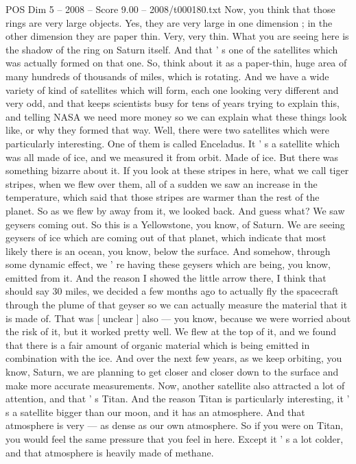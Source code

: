 \begin{textsample}{POS Dim 5 – 2008 – Score 9.00 – 2008/t000180.txt}
Now, you think that those rings are very large objects.
Yes, they are very large in one dimension ; in the other dimension they are paper thin.
Very, very thin.
What you are seeing here is the shadow of the ring on Saturn itself.
And that ' s one of the satellites which was actually formed on that one.
So, think about it as a paper-thin, huge area of many hundreds of thousands of miles, which is rotating.
And we have a wide variety of kind of satellites which will form, each one looking very different and very odd, and that keeps scientists busy for tens of years trying to explain this, and telling NASA we need more money so we can explain what these things look like, or why they formed that way.
Well, there were two satellites which were particularly interesting.
One of them is called Enceladus.
It ' s a satellite which was all made of ice, and we measured it from orbit.
Made of ice.
But there was something bizarre about it.
If you look at these stripes in here, what we call tiger stripes, when we flew over them, all of a sudden we saw an increase in the temperature, which said that those stripes are warmer than the rest of the planet.
So as we flew by away from it, we looked back.
And guess what?
We saw geysers coming out.
So this is a Yellowstone, you know, of Saturn.
We are seeing geysers of ice which are coming out of that planet, which indicate that most likely there is an ocean, you know, below the surface.
And somehow, through some dynamic effect, we ' re having these geysers which are being, you know, emitted from it.
And the reason I showed the little arrow there, I think that should say 30 miles, we decided a few months ago to actually fly the spacecraft through the plume of that geyser so we can actually measure the material that it is made of.
That was [ unclear ] also — you know, because we were worried about the risk of it, but it worked pretty well.
We flew at the top of it, and we found that there is a fair amount of organic material which is being emitted in combination with the ice.
And over the next few years, as we keep orbiting, you know, Saturn, we are planning to get closer and closer down to the surface and make more accurate measurements.
Now, another satellite also attracted a lot of attention, and that ' s Titan.
And the reason Titan is particularly interesting, it ' s a satellite bigger than our moon, and it has an atmosphere.
And that atmosphere is very — as dense as our own atmosphere.
So if you were on Titan, you would feel the same pressure that you feel in here.
Except it ' s a lot colder, and that atmosphere is heavily made of methane.

\end{textsample}
